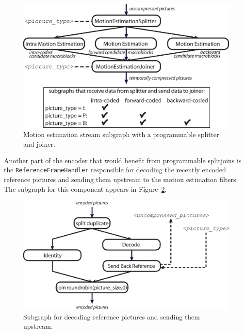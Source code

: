 \begin{figure}[h]
  \begin{center}
    \includegraphics[scale=0.8, angle=0]{./motion_estimation_programmable.eps}
    \caption{Motion estimation stream subgraph with a programmable splitter and joiner.}
    \label{fig:motion_estimation_subgraph2}
  \end{center}
\end{figure}

Another part of the encoder that would benefit from programmable splitjoins
is the \texttt{ReferenceFrameHandler} responsible for decoding the 
recently encoded reference pictures and 
sending them upstream to the motion estimation filters. The subgraph
for this component appears in Figure~\ref{fig:referenceframe}.

\begin{figure}[h]
  \begin{center}
    \includegraphics[scale=0.6, angle=0]{./referenceframe.eps}
    \caption{Subgraph for decoding reference pictures and sending them upstream.}
    \label{fig:referenceframe}
  \end{center}
\end{figure}

